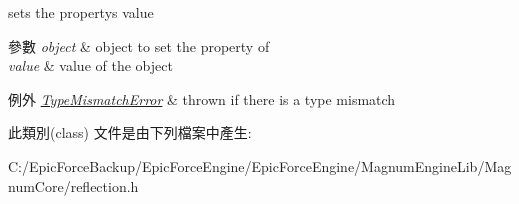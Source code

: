 sets the property\textquotesingle{}s value 


\begin{DoxyParams}{參數}
{\em object} & object to set the property of \\
\hline
{\em value} & value of the object \\
\hline
\end{DoxyParams}

\begin{DoxyExceptions}{例外}
{\em \hyperlink{classagm_1_1reflection_1_1_type_mismatch_error}{Type\+Mismatch\+Error}} & thrown if there is a type mismatch \\
\hline
\end{DoxyExceptions}


此類別(class) 文件是由下列檔案中產生\+:\begin{DoxyCompactItemize}
\item 
C\+:/\+Epic\+Force\+Backup/\+Epic\+Force\+Engine/\+Epic\+Force\+Engine/\+Magnum\+Engine\+Lib/\+Magnum\+Core/reflection.\+h\end{DoxyCompactItemize}
